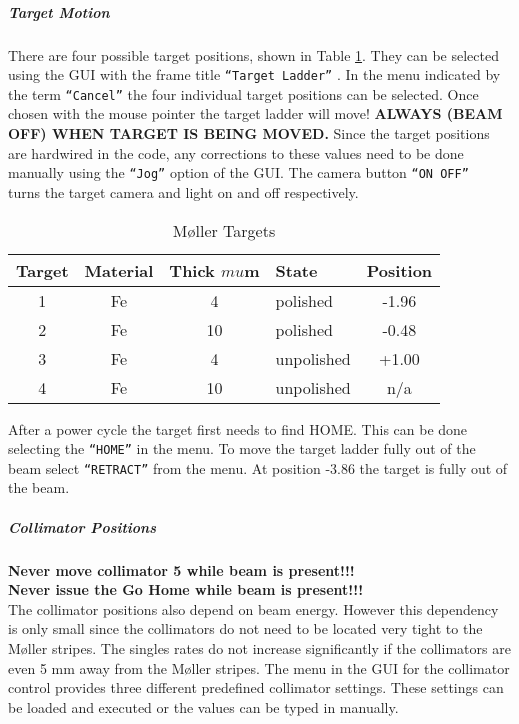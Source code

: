 {%
\subparagraph{Target Motion}
There are four possible target positions, shown in Table \ref{tab_moltar}. They
can be selected using the GUI  
with the frame title {\tt ``Target Ladder''} . In the menu indicated
by the term {\tt ``Cancel''} the four individual target positions 
can be selected. Once chosen with the mouse pointer the 
target ladder will move! {\bf ALWAYS (BEAM OFF) WHEN TARGET IS BEING MOVED.}
Since the target positions are hardwired in the code, any 
corrections to these values need to be done manually using 
the {\tt ``Jog''} option of the GUI. The camera button {\tt ``ON OFF'' }
turns  the target camera and light on and off respectively.
\begin{table}
\begin{center}
\begin{tabular}{|c|c|c|l|c|} \hline
Target & Material & Thick $mu$m & State & Position \\
\hline
1 & Fe & 4  & polished   & -1.96   \\
2 & Fe & 10 & polished   & -0.48  \\
3 & Fe & 4  & unpolished & +1.00  \\
4 & Fe & 10 & unpolished &  n/a \\
\hline 
\end{tabular}
\parbox{10cm}{
\caption{M\o ller Targets\label{tab_moltar}}}
\end{center}
\end{table}
%
After a power cycle the target first needs to find HOME. This can
be done selecting the {\tt ``HOME''} in the menu. To move the target
ladder fully out of the beam select  {\tt ``RETRACT''} from the menu.
At position -3.86 the target is fully out of the beam.
%
\subparagraph{Collimator Positions}
{\bf Never move collimator 5 while beam is present!!!}\\
{\bf Never issue the Go Home while beam is present!!!}\\
The collimator positions also depend on beam energy. However
this dependency is only small since the collimators do not need
to be located very tight to the M\o ller stripes. The singles rates 
do not increase significantly if the collimators are even 5 mm away 
from the M\o ller stripes. The menu in the GUI for the collimator
control provides three different predefined collimator settings.
These settings can be loaded and executed or the values
can be typed in manually.

}
